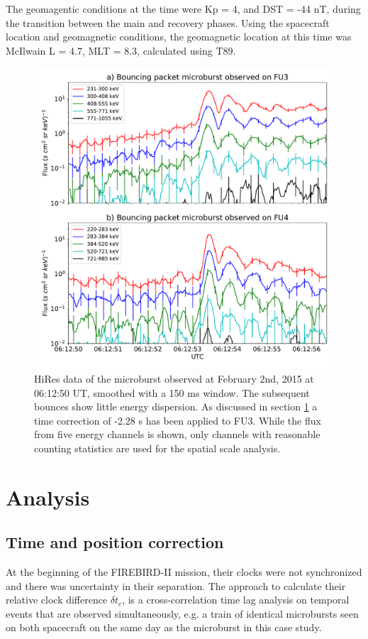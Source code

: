 \documentclass[draft,linenumbers]{agujournal}
\begin{document}
The geomagentic conditions at the time were Kp = 4, and DST = -44 nT, during the transition between the main and recovery phases. Using the spacecraft location and geomagnetic conditions, the geomagnetic location at this time was McIlwain L = 4.7, MLT = 8.3, calculated using T89. 

\begin{figure}
\includegraphics[width=\textwidth]{hires_plot_log_8pt_smooth.pdf}
\caption{HiRes data of the microburst observed at February 2nd, 2015 at 06:12:50 UT, smoothed with a 150 ms window. The subsequent bounces show little energy dispersion. As discussed in section \ref{analysis} a time correction of -2.28 s has been applied to FU3. While the flux from five energy channels is shown, only channels with reasonable counting statistics are used for the spatial scale analysis.}
\label{hires_plot}
\end{figure}

\section{Analysis} \label{analysis} %
\subsection{Time and position correction} \label{corrections}
At the beginning of the FIREBIRD-II mission, their clocks were not synchronized and there was uncertainty in their separation. The approach to calculate their relative clock difference $\delta t_{c}$, is a cross-correlation time lag analysis on temporal events that are observed simultaneously, e.g. a train of identical microbursts seen on both spacecraft on the same day as the microburst in this case study. 
\end{document}
